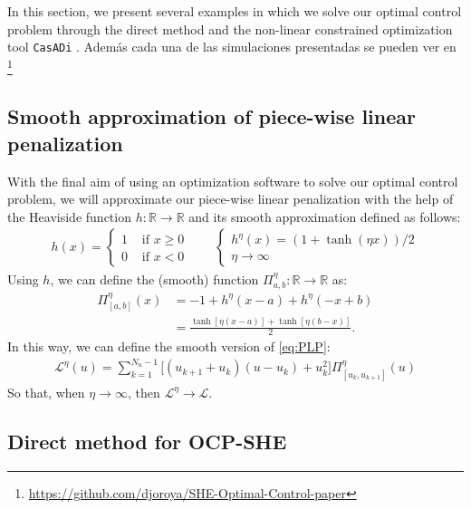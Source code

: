 \documentclass[twocolumn]{autart}    %
\begin{document}
In this section, we present several examples in which we solve our optimal control problem through the direct method and the non-linear constrained optimization tool \texttt{CasADi} \cite{Andersson2019}. Además cada una de las simulaciones presentadas se pueden ver en \footnote{\href{https://github.com/djoroya/SHE-Optimal-Control-paper}{https://github.com/djoroya/SHE-Optimal-Control-paper}}
%
\subsection{Smooth approximation of piece-wise linear penalization}

With the final aim of using an optimization software to solve our optimal control problem, we will approximate our piece-wise linear penalization with the help of the Heaviside function $h:\mathbb{R} \rightarrow \mathbb{R}$ and its smooth approximation defined as follows: 
\begin{gather}
    h(x) = \begin{cases}
        1 & \text{ if } x \geq 0 \\
        0 & \text{ if } x < 0
    \end{cases}    
    \hspace{2em} 
    \begin{cases}
        h^\eta(x) = (1 + \tanh(\eta x))/2   \\
        \eta \rightarrow \infty
    \end{cases}
\end{gather}
Using $h$, we can define the (smooth) function $\Pi_{a,b}^\eta:\mathbb{R} \rightarrow \mathbb{R}$ as:
\begin{align*}
    \Pi_{[a,b]}^\eta(x) &= - 1 + h^\eta(x-a) + h^\eta(-x+b) 
    \\
    &= \frac{\tanh[\eta( x -a)] + \tanh[\eta (b-x)]}{2}.
\end{align*}
In this way, we can define the smooth version of \eqref{eq:PLP}:
\begin{gather}
    \mathcal{L}^\eta(u) = \sum_{k = 1}^{N_u-1} \big[ (u_{k+1}+u_{k}) (u-u_k) + u_k^2 \big] \Pi^\eta_{[u_k,u_{k+1}]}(u)
\end{gather}
So that, when $\eta \rightarrow \infty$, then $\mathcal{L}^\eta \rightarrow \mathcal{L}$. 

\subsection{Direct method  for  OCP-SHE}
\end{document}

